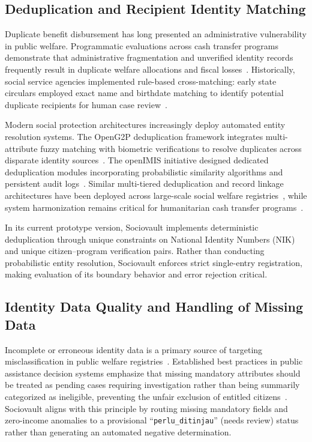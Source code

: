 \documentclass[runningheads]{llncs}
\begin{document}
\subsection{Deduplication and Recipient Identity Matching}

Duplicate benefit disbursement has long presented an administrative vulnerability in public welfare. Programmatic evaluations across cash transfer programs demonstrate that administrative fragmentation and unverified identity records frequently result in duplicate welfare allocations and fiscal losses~\cite{davis2016evidence}. Historically, social service agencies implemented rule-based cross-matching: early state circulars employed exact name and birthdate matching to identify potential duplicate recipients for human case review~\cite{california1987match,california1994letter}.

Modern social protection architectures increasingly deploy automated entity resolution systems. The OpenG2P deduplication framework integrates multi-attribute fuzzy matching with biometric verifications to resolve duplicates across disparate identity sources~\cite{openg2p_dedup}. The openIMIS initiative designed dedicated deduplication modules incorporating probabilistic similarity algorithms and persistent audit logs~\cite{openimis2022algorithm}. Similar multi-tiered deduplication and record linkage architectures have been deployed across large-scale social welfare registries~\cite{pita2020cidacs}, while system harmonization remains critical for humanitarian cash transfer programs~\cite{owino2020harmonising}.

In its current prototype version, Sociovault implements deterministic deduplication through unique constraints on National Identity Numbers (NIK) and unique citizen--program verification pairs. Rather than conducting probabilistic entity resolution, Sociovault enforces strict single-entry registration, making evaluation of its boundary behavior and error rejection critical.

\subsection{Identity Data Quality and Handling of Missing Data}

Incomplete or erroneous identity data is a primary source of targeting misclassification in public welfare registries~\cite{lindert2020sourcebook}. Established best practices in public assistance decision systems emphasize that missing mandatory attributes should be treated as pending cases requiring investigation rather than being summarily categorized as ineligible, preventing the unfair exclusion of entitled citizens~\cite{lindert2020sourcebook,hadiwidjaja2022improving}. Sociovault aligns with this principle by routing missing mandatory fields and zero-income anomalies to a provisional ``\texttt{perlu\_ditinjau}'' (needs review) status rather than generating an automated negative determination.
\end{document}
